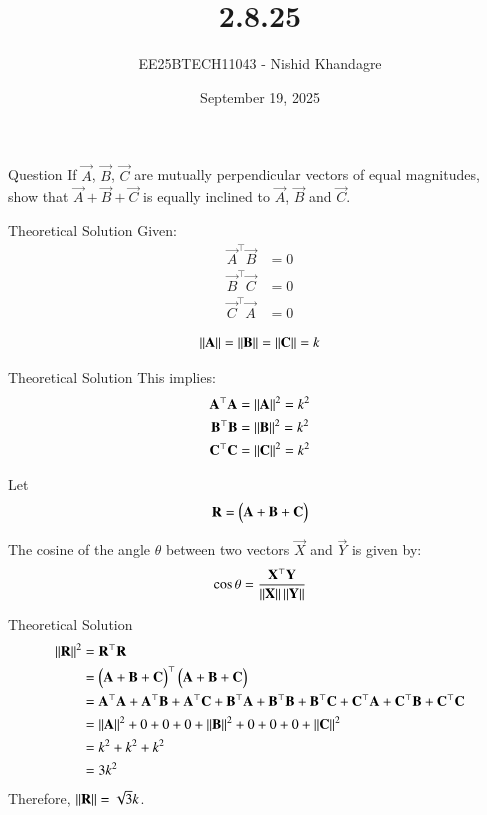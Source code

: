 \documentclass{beamer}
\title
{2.8.25}
\date{September 19, 2025}
\author
{EE25BTECH11043 - Nishid Khandagre}
\begin{document}
\frame{\titlepage}

\begin{frame}{Question}
If $\vec{A}$, $\vec{B}$, $\vec{C}$ are mutually perpendicular vectors of equal magnitudes, show that $\vec{A}+\vec{B}+\vec{C}$ is equally inclined to $\vec{A}$, $\vec{B}$ and $\vec{C}$.
\end{frame}

\begin{frame}{Theoretical Solution}
Given:
\begin{align}
\vec{A}^\top \vec{B} &= 0 \\
\vec{B}^\top \vec{C} &= 0 \\
\vec{C}^\top \vec{A} &= 0
\end{align}

\begin{align}
\left\lVert\mathbf{A}\right\rVert = \left\lVert\mathbf{B}\right\rVert = \left\lVert\mathbf{C}\right\rVert = k
\end{align}
\end{frame}

\begin{frame}{Theoretical Solution}
This implies:
\begin{align}
\mathbf{A}^\top \mathbf{A} &= \left\lVert\mathbf{A}\right\rVert^2 = k^2 \\
\mathbf{B}^\top \mathbf{B} &= \left\lVert\mathbf{B}\right\rVert^2 = k^2 \\
\mathbf{C}^\top \mathbf{C} &= \left\lVert\mathbf{C}\right\rVert^2 = k^2
\end{align}

Let
\begin{align}
\mathbf{R} = \begin{pmatrix}\mathbf{A} + \mathbf{B} + \mathbf{C}\end{pmatrix}
\end{align}

The cosine of the angle $\theta$ between two vectors $\vec{X}$ and $\vec{Y}$ is given by:
\begin{align}
\cos \theta = \frac{\mathbf{X}^\top \mathbf{Y}}{\left\lVert\mathbf{X}\right\rVert\left\lVert\mathbf{Y}\right\rVert}
\label{eq:equation}
\end{align}
\end{frame}

\begin{frame}{Theoretical Solution}
\begin{align}
\left\lVert\mathbf{R}\right\rVert^2 &= \mathbf{R}^\top \mathbf{R} \\
&=\begin{pmatrix}\mathbf{A} + \mathbf{B} + \mathbf{C}\end{pmatrix}^\top\begin{pmatrix}\mathbf{A} + \mathbf{B} + \mathbf{C}\end{pmatrix} \\
&=\mathbf{A}^\top\mathbf{A}+\mathbf{A}^\top\mathbf{B}+\mathbf{A}^\top\mathbf{C}+\mathbf{B}^\top\mathbf{A}+\mathbf{B}^\top\mathbf{B}+\mathbf{B}^\top\mathbf{C}+\mathbf{C}^\top\mathbf{A}+\mathbf{C}^\top\mathbf{B}+\mathbf{C}^\top\mathbf{C} \\
&=\left\lVert\mathbf{A}\right\rVert^2 + 0 + 0 + 0 + \left\lVert\mathbf{B}\right\rVert^2 + 0 + 0 + 0 + \left\lVert\mathbf{C}\right\rVert^2 \\
&=k^2 + k^2 + k^2\\
&=3k^2
\end{align}
Therefore, $\left\lVert\mathbf{R}\right\rVert = \sqrt{3}k$.
\end{frame}
\end{document}
